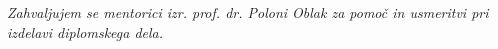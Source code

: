\documentclass[a4paper, 12pt]{book}
\newcommand{\clearemptydoublepage}{\newpage{\pagestyle{empty}\cleardoublepage}}
\begin{document}
\clearemptydoublepage

\thispagestyle{empty}\mbox{}\vfill\null\it%
\noindent
Zahvaljujem se mentorici izr. prof. dr. Poloni Oblak za pomoč in usmeritvi pri izdelavi diplomskega dela.\\
\rm\normalfont

\clearemptydoublepage




\pagestyle{empty}
\def\thepage{}%
\tableofcontents{}


\clearemptydoublepage




\end{document}
